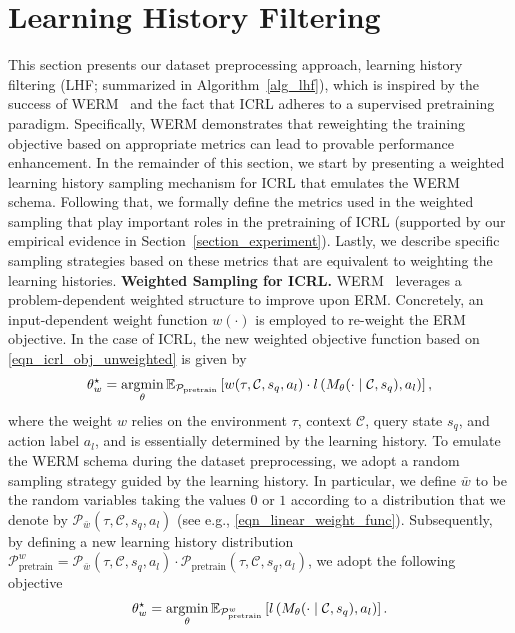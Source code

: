 \documentclass{article}
\newcommand{\argmin}{\operatornamewithlimits{argmin}}
\def\mbE{{\ensuremath{\mathbb E}}}
\def\ccalC{{\ensuremath{\mathcal C}}}
\def\ccalP{{\ensuremath{\mathcal P}}}
\begin{document}
\section{Learning History Filtering}
\label{section_LHF}
This section presents our dataset preprocessing approach, learning history filtering (LHF; summarized in Algorithm~\ref{alg_lhf}), which is inspired by the success of WERM~\cite{zhang2025reweighting} and the fact that ICRL adheres to a supervised pretraining paradigm. Specifically, WERM demonstrates that reweighting the training objective based on appropriate metrics can lead to provable performance enhancement.
In the remainder of this section, we start by presenting a weighted learning history sampling mechanism for ICRL that emulates the WERM schema. Following that, we formally define the metrics used in the weighted sampling that play important roles in the pretraining of ICRL (supported by our empirical evidence in Section~\ref{section_experiment}). Lastly, we describe specific sampling strategies based on these metrics that are equivalent to weighting the learning histories.
\textbf{Weighted Sampling for ICRL.}
WERM~\cite{zhang2025reweighting} leverages a problem-dependent weighted structure to improve upon ERM. Concretely, an input-dependent weight function $w(\cdot)$ is employed to re-weight the ERM objective. In the case of ICRL, the new weighted objective function based on \eqref{eqn_icrl_obj_unweighted} is given by
\begin{align}\label{eqn_icrl_obj_weighted_train}
    \theta_w^\star = \argmin_\theta \mbE_{\ccalP_{\text{pretrain}}} \left[ w(\tau, \mathcal{C}, s_q, a_l) \cdot l \left( M_\theta(\cdot \mid \ccalC, s_{q}), a_{l}\right) \right],
\end{align}
where the weight $w$ relies on the environment $\tau$, context $\ccalC$, query state $s_q$, and action label $a_l$, and is essentially determined by the learning history.
To emulate the WERM schema during the dataset preprocessing, we adopt a random sampling strategy guided by the learning history. In particular, we define $\bar{w}$ to be the random variables taking the values $0$ or $1$ according to a distribution that we denote by $\mathcal{P}_{\bar{w}}(\tau,\mathcal{C},s_q,a_l)$ (see e.g., \eqref{eqn_linear_weight_func}). Subsequently, by defining a new learning history distribution $\ccalP_{\text{pretrain}}^w = \mathcal{P}_{\bar{w}}(\tau, \mathcal{C}, s_q, a_l) \cdot \ccalP_{\text{pretrain}} (\tau, \ccalC, s_{q}, a_{l})$, we adopt the following objective
\begin{align}\label{eqn_icrl_obj_weighted_data}
    \theta_w^\star = \argmin_\theta \mbE_{\ccalP_{\text{pretrain}}^w} \left[ l \left( M_\theta(\cdot \mid \ccalC, s_{q}), a_{l}\right) \right].
\end{align}
\end{document}
